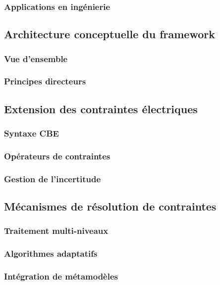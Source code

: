 \documentclass[a4paper,12pt]{article}
\begin{document}
\subsubsection{Applications en ingénierie}
\label{sec:orgdd7ca93}
\subsection{Architecture conceptuelle du framework}
\label{sec:org290e736}
\subsubsection{Vue d'ensemble}
\label{sec:orgffcfb60}
\subsubsection{Principes directeurs}
\label{sec:org8d2b3dd}
\subsection{Extension des contraintes électriques}
\label{sec:orgad7a901}
\subsubsection{Syntaxe CBE}
\label{sec:orge5c9f54}
\subsubsection{Opérateurs de contraintes}
\label{sec:org4937e1a}
\subsubsection{Gestion de l'incertitude}
\label{sec:org18a0522}
\subsection{Mécanismes de résolution de contraintes}
\label{sec:orgfe5feda}
\subsubsection{Traitement multi-niveaux}
\label{sec:org85fd8f4}
\subsubsection{Algorithmes adaptatifs}
\label{sec:orgb4e9367}
\subsubsection{Intégration de métamodèles}
\label{sec:org4a4557d}
\end{document}
